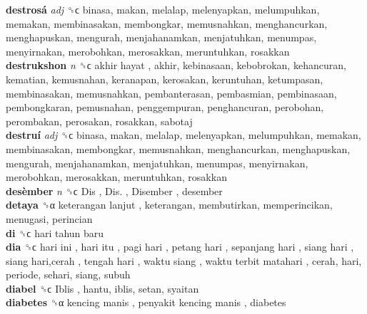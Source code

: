 \textbf{destrosá} \emph{adj}  ␝ϲ  binasa, makan, melalap, melenyapkan, melumpuhkan, memakan, membinasakan, membongkar, memusnahkan, menghancurkan, menghapuskan, mengurah, menjahanamkan, menjatuhkan, menumpas, menyirnakan, merobohkan, merosakkan, meruntuhkan, rosakkan  \\
\textbf{destrukshon} \emph{n}  ␝ϲ   akhir hayat , akhir, kebinasaan, kebobrokan, kehancuran, kematian, kemusnahan, keranapan, kerosakan, keruntuhan, ketumpasan, membinasakan, memusnahkan, pembanterasan, pembasmian, pembinasaan, pembongkaran, pemusnahan, penggempuran, penghancuran, perobohan, perombakan, perosakan, rosakkan, sabotaj  \\
\textbf{destruí} \emph{adj}  ␝ϲ  binasa, makan, melalap, melenyapkan, melumpuhkan, memakan, membinasakan, membongkar, memusnahkan, menghancurkan, menghapuskan, mengurah, menjahanamkan, menjatuhkan, menumpas, menyirnakan, merobohkan, merosakkan, meruntuhkan, rosakkan  \\
\textbf{desèmber} \emph{n}  ␝ϲ   Dis ,  Dis. ,  Disember , desember  \\
\textbf{detaya} ␝α   keterangan lanjut , keterangan, membutirkan, memperincikan, menugasi, perincian  \\
\textbf{di} ␝ϲ   hari tahun baru   \\
\textbf{dia} ␝ϲ   hari ini ,  hari itu ,  pagi hari ,  petang hari ,  sepanjang hari ,  siang hari ,  siang hari,cerah ,  tengah hari ,  waktu siang ,  waktu terbit matahari , cerah, hari, periode, sehari, siang, subuh  \\
\textbf{diabel} ␝ϲ   Iblis , hantu, iblis, setan, syaitan  \\
\textbf{diabetes} ␝α   kencing manis ,  penyakit kencing manis , diabetes  \\
